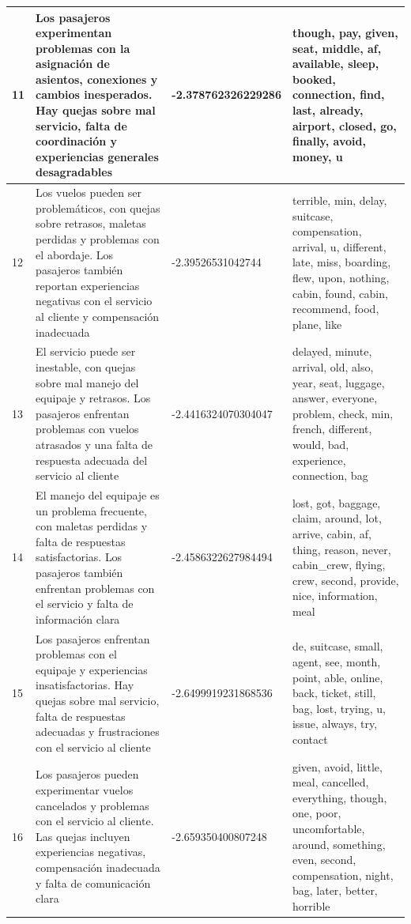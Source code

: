 \documentclass{report}
\begin{document}
{{\begin{longtable}{|p{1cm}|p{4cm}|p{4cm}|p{6cm}|}
                    \hline
                    11 & Los pasajeros experimentan problemas con la asignación de asientos, conexiones y cambios inesperados. Hay quejas sobre mal servicio, falta de coordinación y experiencias generales desagradables & -2.378762326229286 & though, pay, given, seat, middle, af, available, sleep, booked, connection, find, last, already, airport, closed, go, finally, avoid, money, u \\
                    \hline
                    12 & Los vuelos pueden ser problemáticos, con quejas sobre retrasos, maletas perdidas y problemas con el abordaje. Los pasajeros también reportan experiencias negativas con el servicio al cliente y compensación inadecuada & -2.39526531042744 & terrible, min, delay, suitcase, compensation, arrival, u, different, late, miss, boarding, flew, upon, nothing, cabin, found, cabin, recommend, food, plane, like \\
                    \hline
                    13 & El servicio puede ser inestable, con quejas sobre mal manejo del equipaje y retrasos. Los pasajeros enfrentan problemas con vuelos atrasados y una falta de respuesta adecuada del servicio al cliente & -2.4416324070304047 & delayed, minute, arrival, old, also, year, seat, luggage, answer, everyone, problem, check, min, french, different, would, bad, experience, connection, bag \\
                    \hline
                    14 & El manejo del equipaje es un problema frecuente, con maletas perdidas y falta de respuestas satisfactorias. Los pasajeros también enfrentan problemas con el servicio y falta de información clara & -2.4586322627984494 & lost, got, baggage, claim, around, lot, arrive, cabin, af, thing, reason, never, cabin\_crew, flying, crew, second, provide, nice, information, meal \\
                    \hline
                    15 & Los pasajeros enfrentan problemas con el equipaje y experiencias insatisfactorias. Hay quejas sobre mal servicio, falta de respuestas adecuadas y frustraciones con el servicio al cliente & -2.6499919231868536 & de, suitcase, small, agent, see, month, point, able, online, back, ticket, still, bag, lost, trying, u, issue, always, try, contact \\
                    \hline
                    16 & Los pasajeros pueden experimentar vuelos cancelados y problemas con el servicio al cliente. Las quejas incluyen experiencias negativas, compensación inadecuada y falta de comunicación clara & -2.659350400807248 & given, avoid, little, meal, cancelled, everything, though, one, poor, uncomfortable, around, something, even, second, compensation, night, bag, later, better, horrible \\

\end{longtable}}}
\end{document}
